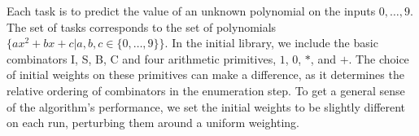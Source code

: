 \documentclass{article}
\newtheorem{definition}{Definition}
\begin{document}



Each task is to predict the value of an unknown polynomial on the
inputs $0, \dots, 9$. The set of tasks corresponds to the set of
polynomials $\{ax^2 + bx + c | a, b, c \in \{0, \dots, 9 \}\}$. In the
initial library, we include the basic combinators I, S, B, C and four
arithmetic primitives, $1$, $0$, $*$, and $+$. The choice of initial
weights on these primitives can make a difference, as it determines
the relative ordering of combinators in the enumeration step. To get a
general sense of the algorithm's performance, we set the initial
weights to be slightly different on each run, perturbing them around a
uniform weighting.
\end{document}
